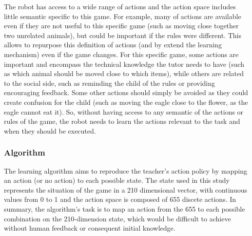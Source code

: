 The robot has access to a wide range of actions and the action space includes little semantic specific to this game. For example, many of actions are available even if they are not useful to this specific game (such as moving close together two unrelated animals), but could be important if the rules were different. This allows to repurpose this definition of actions (and by extend the learning mechanism) even if the game changes. For this specific game, some actions are important and encompass the technical knowledge the tutor needs to have (such as which animal should be moved close to which items), while others are related to the social side, such as reminding the child of the rules or providing encouraging feedback. Some other actions should simply be avoided as they could create confusion for the child (such as moving the eagle close to the flower, as the eagle cannot eat it). So, without having access to any semantic of the actions or rules of the game, the robot needs to learn the actions relevant to the task and when they should be executed.




\subsubsection{Algorithm} \label{sec:tuto_algo}
The learning algorithm aims to reproduce the teacher's action policy by mapping an action (or no action) to each possible state. The state used in this study represents the situation of the game in a 210 dimensional vector, with continuous values from 0 to 1 and the action space is composed of 655 discete actions. In summary, the algorithm's task is to map an action from the 655 to each possible combination on the 210-dimension state, which would be difficult to achieve without human feedback or consequent initial knowledge.

